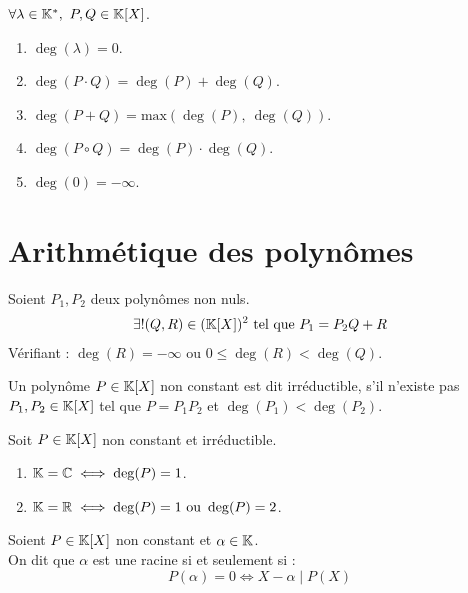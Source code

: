 \begin{proposition}
	$\forall \lambda \in \mathbb{K}^*,\ P, Q \in \mathbb{K}[X]$. 
	\begin{enumerate}
    		\item $\deg(\lambda) = 0$.
    		\item $\deg(P \cdot Q) = \deg(P) + \deg(Q)$.
    		\item $\deg(P + Q) = \mathrm{max}\left(\deg(P),\ \deg(Q)\right)$.
    		\item $\deg(P \circ Q) = \deg(P) \cdot \deg(Q)$.
            \item $\deg(0) = -\infty$.
    	\end{enumerate}
\end{proposition}

\section{Arithmétique des polynômes}

\begin{theorem}
	Soient $P_1, P_2$ deux polynômes non nuls.
	\begin{align*}
		\exists ! (Q, R) \in (\mathbb{K}[X])^2 \text{ tel que } P_1 = P_2 Q + R 
	\end{align*}
	Vérifiant :
	$\deg(R) = -\infty$ ou $0 \leq \deg(R) < \deg(Q)$.
\end{theorem}

\begin{definition}
	Un polynôme $P \in \mathbb{K}[X]$ non constant est dit irréductible, s'il n'existe pas $P_1, P_2 \in \mathbb{K}[X]$ tel que $P = P_1 P_2$ et $\deg(P_1) < \deg(P_2)$.
\end{definition}

\begin{proposition}
	Soit $P \in \mathbb{K}[X]$ non constant et irréductible.
	\begin{enumerate}
		\item $\mathbb{K} = \mathbb{C} \iff \deg(P) = 1$.
		\item $\mathbb{K} = \mathbb{R} \iff \deg(P) = 1 \text{ ou } \deg(P) = 2$. 
	\end{enumerate}
\end{proposition}

\begin{proposition}
	Soient $P \in \mathbb{K}[X]$ non constant et $\alpha \in \mathbb{K}$.
	\\
	On dit que $\alpha$ est une racine si et seulement si :
	\[ P(\alpha) = 0 \iff X - \alpha \mid P(X) \]
\end{proposition}

